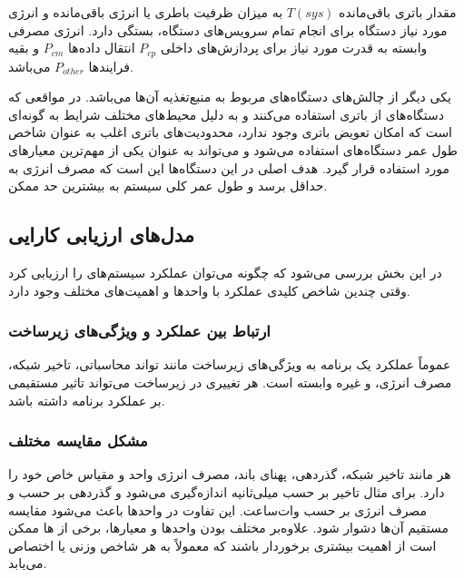 مقدار باتری باقی‌مانده $T(sys)$ به میزان ظرفیت باطری یا انرژی باقی‌مانده و انرژی
مورد نیاز دستگاه برای انجام تمام سرویس‌های دستگاه، بستگی دارد. انرژی مصرفی
وابسته به قدرت مورد نیاز برای پردازش‌های داخلی $P_{cp}$ انتقال داده‌ها $P_{cm}$
و بقیه فرایند‌ها $P_{other}$ می‌باشد.


یکی دیگر از چالش‌های دستگاه‌های  مربوط به منبع‌تغذیه آن‌ها می‌باشد. در
مواقعی که دستگاه‌های  از باتری استفاده می‌کنند و به دلیل محیط‌های مختلف
شرایط به گونه‌ای است که امکان تعویض باتری وجود ندارد، محدودیت‌های باتری اغلب به
عنوان شاخص طول عمر دستگاه‌های  استفاده می‌شود و می‌تواند به عنوان یکی از
مهم‌ترین معیار‌های  مورد استفاده قرار گیرد. هدف اصلی در این دستگاه‌ها
این است که مصرف انرژی به حداقل برسد و طول عمر کلی سیستم به بیشترین حد ممکن.

\subsection{مدل‌های ارزیابی کارایی}

در این بخش بررسی می‌شود که چگونه می‌توان عملکرد سیستم‌های  را ارزیابی
کرد وقتی چندین شاخص کلیدی عملکرد  با واحد‌ها و اهمیت‌های مختلف وجود
دارد.

\subsubsection{ارتباط بین عملکرد و ویژگی‌های زیرساخت }

عموماً عملکرد یک برنامه به ویژگی‌های زیرساخت  مانند تواند محاسباتی،
تاخیر شبکه، مصرف انرژی، و غیره وابسته است. هر تغییری در زیرساخت 
می‌تواند تاثیر مستقیمی بر عملکرد برنامه داشته باشد.

\subsubsection{مشکل مقایسه  مختلف}

هر  مانند تاخیر شبکه، گذردهی، پهنای باند، مصرف انرژی واحد و مقیاس خاص
خود را دارد. برای مثال تاخیر بر حسب میلی‌ثانیه  اندازه‌گیری می‌شود و
گذردهی بر حسب  و مصرف انرژی بر حسب وات‌ساعت. این تفاوت در واحد‌ها باعث
می‌شود مقایسه مستقیم آن‌ها دشوار شود. علاوه‌بر مختلف بودن واحد‌ها و معیار‌ها،
برخی از ها ممکن است از اهمیت بیشتری برخوردار باشند که معمولاً به هر شاخص
وزنی یا  اختصاص می‌یابد.


